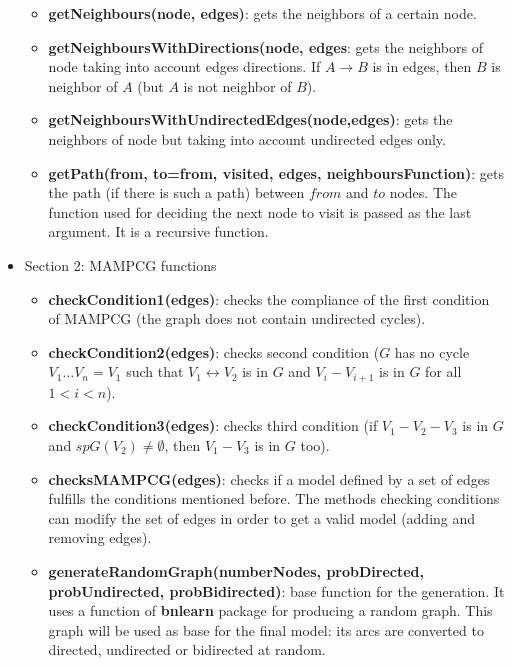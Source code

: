 \documentclass[11pt,professionalfont]{article}
\begin{document}
\begin{itemize}
\begin{itemize}
	\item \textbf{getNeighbours(node, edges)}: gets the neighbors of a certain
			node.

	\item \textbf{getNeighboursWithDirections(node, edges}: gets the neighbors
			of node taking into account edges directions. If $A \rightarrow B$
			is in edges, then $B$ is neighbor of $A$ (but $A$ is not neighbor
			of $B$). 

	\item \textbf{getNeighboursWithUndirectedEdges(node,edges)}: gets the neighbors
			of node but taking into account undirected edges only.

	\item \textbf{getPath(from, to=from, visited, edges, neighboursFunction)}: 
			gets the path (if there is such a path) between $from$ and $to$ nodes.
			The function used for deciding the next node to visit is passed as
			the last argument. It is a recursive function.
	\end{itemize}

\item Section 2: MAMPCG functions

  \begin{itemize}
	
	\item \textbf{checkCondition1(edges)}: checks the compliance of the first
			condition of MAMPCG (the graph does not contain undirected cycles).

	\item \textbf{checkCondition2(edges)}: checks second condition
			($G$ has no cycle $V_1 \ldots V_n = V_1$ such that 
			$V_1  \leftrightarrow V_2$ is in $G$ and $V_{i} - V_{i+1}$ is in
			$G$ for all $1 < i < n$).

	\item \textbf{checkCondition3(edges)}: checks third condition (if 
			$V_{1} - V_{2} - V_{3}$ is in $G$ and $spG(V_{2}) \neq \emptyset$, 
			then $V_{1} - V_{3}$ is in $G$ too).

	\item \textbf{checksMAMPCG(edges)}: checks if a model defined by a set of
			edges fulfills the conditions mentioned before. The methods checking
			conditions can modify the set of edges in order to get a valid
			model (adding and removing edges).

	\item \textbf{generateRandomGraph(numberNodes, probDirected, probUndirec\-ted, 					probBidirected)}: base function for the generation. It uses a function of \textbf{bnlearn} 
			package for producing a random graph.  This graph will be used as base for the 
			final model: its arcs are converted to directed, undirected or bidirected at 
			random.


\end{itemize}
\end{itemize}
\end{document}

